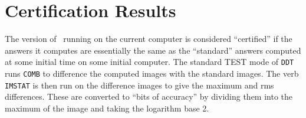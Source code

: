 
\section{Certification Results}

The version of \AIPS\ running on the current computer is considered
``certified'' if the answers it computes are essentially the same as
the ``standard'' answers computed at some initial time on some initial
computer.  The standard TEST mode of {\tt DDT} runs {\tt COMB} to
difference the computed images with the standard images.  The verb
{\tt IMSTAT} is then run on the difference images to give the maximum
and rms differences.  These are converted to ``bits of accuracy'' by
dividing them into the maximum of the image and taking the logarithm
base 2.


